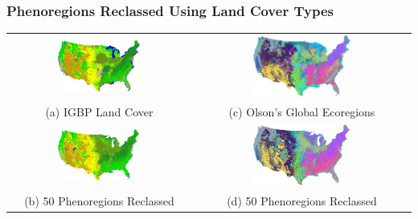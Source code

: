 \begin{frame}
 \frametitle{Phenoregions Reclassed Using Land Cover Types}\small
 \vskip-0.10in
 \begin{tabular}{c c}
  \includegraphics[width=0.47\textwidth]{figures/landcover.igbp.png} &
  \includegraphics[width=0.47\textwidth]{figures/landcover.oge.png} \\
  (a) IGBP Land Cover & (c) Olson's Global Ecoregions \\
  \includegraphics[width=0.47\textwidth]{figures/phendump_2000_2012.50.maxmode.reclassed_igbp.png} &
  \includegraphics[width=0.47\textwidth]{figures/phendump_2000_2012.50.maxmode.reclassed_oge.png} \\
  (b) 50 Phenoregions Reclassed & (d) 50 Phenoregions Reclassed \\
 \end{tabular}
\end{frame}

